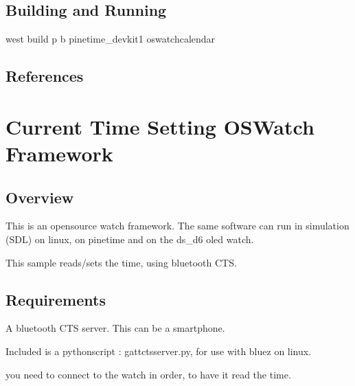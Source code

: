 \documentclass[letterpaper,10pt,english]{sphinxmanual}
\begin{document}
\subsection{Building and Running}
\label{\detokenize{samples/oswatch-calendarREADME:building-and-running}}
west build \sphinxhyphen{}p \sphinxhyphen{}b  pinetime\_devkit1 oswatch\sphinxhyphen{}calendar


\subsection{References}
\label{\detokenize{samples/oswatch-calendarREADME:references}}

\section{Current Time Setting  OSWatch Framework}
\label{\detokenize{samples/oswatch-ctsREADME:current-time-setting-oswatch-framework}}\label{\detokenize{samples/oswatch-ctsREADME:oswatch}}\label{\detokenize{samples/oswatch-ctsREADME::doc}}

\subsection{Overview}
\label{\detokenize{samples/oswatch-ctsREADME:overview}}
This is an opensource watch framework.
The same software can run in simulation (SDL) on linux, on pinetime and on the ds\_d6 oled watch.

This sample reads/sets the time, using bluetooth CTS.


\subsection{Requirements}
\label{\detokenize{samples/oswatch-ctsREADME:requirements}}
A bluetooth CTS server.
This can be a smartphone.

Included is a python\sphinxhyphen{}script : gatt\sphinxhyphen{}cts\sphinxhyphen{}server.py, for use with bluez on linux.

\begin{sphinxVerbatim}[commandchars=\\\{\}]
 
\end{sphinxVerbatim}

you need to connect to the watch in order, to have it read the time.

\begin{sphinxVerbatim}[commandchars=\\\{\}]
      
      
\end{sphinxVerbatim}
\end{document}
